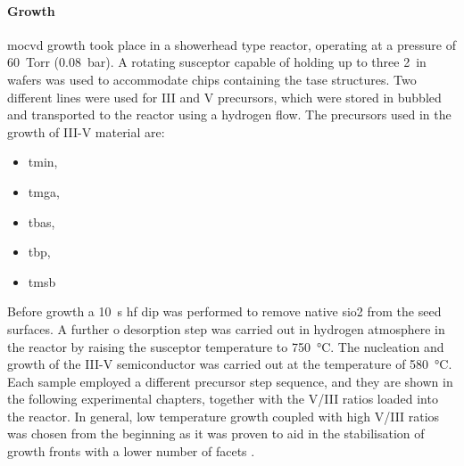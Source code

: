 \paragraph{Growth} \Acs{mocvd} growth took place in a showerhead type reactor, operating at a pressure of \qty{60}{Torr} (\qty{0.08}{bar}). A rotating susceptor capable of holding up to three \qty{2}{in} wafers was used to accommodate  chips containing the \acs{tase} structures. Two different lines were used for III and V precursors, which were stored in bubbled and transported to the reactor using a hydrogen flow. The precursors used in the growth of III-V material are:
\begin{itemize}
    \item \acf{tmin},
    \item \acf{tmga},
    \item \acf{tbas},
    \item \acf{tbp},
    \item \acf{tmsb}
\end{itemize}

Before growth a \qty{10}{\second} \acf{hf} dip was performed to remove native \acs{sio2} from the seed surfaces. A further \acl{o} desorption step was carried out in hydrogen atmosphere in the reactor by raising the susceptor temperature to \qty{750}{\degreeCelsius}. The nucleation and growth of the III-V semiconductor was carried out at the temperature of \qty{580}{\degreeCelsius}. Each sample employed a different precursor step sequence, and they are shown in the following experimental chapters, together with the V/III ratios loaded into the reactor. In general, low temperature growth coupled with high V/III ratios was chosen from the beginning as it was proven to aid in the stabilisation of growth fronts with a lower number of facets \cite{Goswami2020}.